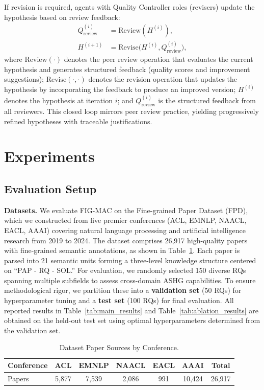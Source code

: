 \documentclass[runningheads]{llncs}
\begin{document}
If revision is required, agents with Quality Controller roles (revisers) update the hypothesis based on review feedback:
\begin{align}
    Q_{\text{review}}^{(i)} &= \text{Review}(H^{(i)}), \\
    H^{(i+1)} &= \text{Revise}\big(H^{(i)}, Q_{\text{review}}^{(i)}\big),
\end{align}
where $\text{Review}(\cdot)$ denotes the peer review operation that evaluates the current hypothesis and generates structured feedback (quality scores and improvement suggestions); $\text{Revise}(\cdot, \cdot)$ denotes the revision operation that updates the hypothesis by incorporating the feedback to produce an improved version; $H^{(i)}$ denotes the hypothesis at iteration $i$; and $Q_{\text{review}}^{(i)}$ is the structured feedback from all reviewers. This closed loop mirrors peer review practice, yielding progressively refined hypotheses with traceable justifications.



\section{Experiments}
\subsection{Evaluation Setup}

\textbf{Datasets.} We evaluate FIG-MAC on the Fine-grained Paper Dataset (FPD), which we constructed from five premier conferences (ACL, EMNLP, NAACL, EACL, AAAI) covering natural language processing and artificial intelligence research from 2019 to 2024. The dataset comprises 26,917 high-quality papers with fine-grained semantic annotations, as shown in Table~\ref{tab:dataset_sources}. Each paper is parsed into 21 semantic units forming a three-level knowledge structure centered on ``PAP - RQ - SOL.'' For evaluation, we randomly selected 150 diverse RQs spanning multiple subfields to assess cross-domain ASHG capabilities. To ensure methodological rigor, we partition these into a \textbf{validation set} (50 RQs) for hyperparameter tuning and a \textbf{test set} (100 RQs) for final evaluation. All reported results in Table~\ref{tab:main_results} and Table~\ref{tab:ablation_results} are obtained on the held-out test set using optimal hyperparameters determined from the validation set.

\begin{table}[t]
\centering
\small
\begin{tabular}{lcccccc}
\toprule
\textbf{Conference} & ACL & EMNLP & NAACL & EACL & AAAI & \textbf{Total} \\
\midrule
Papers & 5,877 & 7,539 & 2,086 & 991 & 10,424 & 26,917 \\
\bottomrule
\end{tabular}
\caption{Dataset Paper Sources by Conference.}
\label{tab:dataset_sources}
\end{table}
\end{document}
